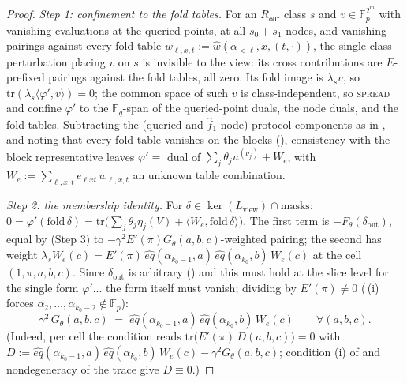\documentclass{article}
\newcommand{\Fp}{\mathbb{F}_p}
\newcommand{\Fq}{\mathbb{F}_q}
\theoremstyle{definition}
\begin{document}
\begin{proof}
\emph{Step 1: confinement to the fold tables.} For an $R_{\mathsf{out}}$ class $s$ and $v \in \Fp^{2^m}$ with vanishing evaluations at the queried points, at all $s_0 + s_1$ nodes, and vanishing pairings against every fold table $w_{\ell, x, t} := \hat{w}(\alpha_{<\ell}, x, (t, \cdot))$, the single-class perturbation placing $v$ on $s$ is invisible to the view: its cross contributions are $E$-prefixed pairings against the fold tables, all zero. Its fold image is $\lambda_s v$, so $\mathrm{tr}(\lambda_s \langle \varphi', v \rangle) = 0$; the common space of such $v$ is class-independent, so \textsc{spread} and  confine $\varphi'$ to the $\Fq$-span of the queried-point duals, the node duals, and the fold tables. Subtracting the (queried and $\hat{f}_1$-node) protocol components as in , and noting that every fold table vanishes on the blocks (), consistency with the block representative leaves
$\varphi' = $ dual of $\sum_j \theta_j u^{(\nu_j)} + W_e$, with $W_e := \sum_{\ell, x, t} e_{\ell x t}\, w_{\ell, x, t}$ an unknown table combination.

\emph{Step 2: the membership identity.} For $\delta \in \ker(L_{\mathrm{view}}) \cap \mathrm{masks}$: $0 = \varphi'(\mathrm{fold}\,\delta) = \mathrm{tr}\big( \sum_j \theta_j \eta_j(V) + \langle W_e, \mathrm{fold}\,\delta \rangle \big)$. The first term is $-F_\theta(\delta_{\mathrm{out}})$, equal by  (Step 3) to $-\gamma^2 E'(\pi) G_\theta(a,b,c)$-weighted pairing; the second has weight $\lambda_s W_e(c) = E'(\pi)\, \hat{eq}(\alpha_{k_0-1}, a)\, \hat{eq}(\alpha_{k_0}, b)\, W_e(c)$ at the cell $(1, \pi, a, b, c)$. Since $\delta_{\mathrm{out}}$ is arbitrary () and this must hold at the slice level for the single form $\varphi'$... the form itself must vanish; dividing by $E'(\pi) \neq 0$ (\,(i) forces $\alpha_2, \dots, \alpha_{k_0-2} \notin \Fp$):
\begin{equation}\label{eq:noother}
\gamma^2\, G_\theta(a, b, c) \;=\; \hat{eq}(\alpha_{k_0-1}, a)\, \hat{eq}(\alpha_{k_0}, b)\, W_e(c) \qquad \forall (a, b, c) .
\end{equation}
(Indeed, per cell the condition reads $\mathrm{tr}\big(E'(\pi)\, D(a,b,c)\big) = 0$ with $D := \hat{eq}(\alpha_{k_0-1}, a)\, \hat{eq}(\alpha_{k_0}, b)\, W_e(c) - \gamma^2 G_\theta(a,b,c)$; condition (i) of  and nondegeneracy of the trace give $D \equiv 0$.)


\end{proof}
\end{document}
